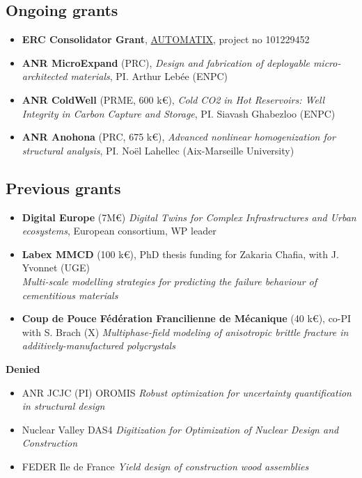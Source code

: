 \subsection*{\textcolor{navier_blue}{Ongoing grants}}
\begin{itemize}[noitemsep]
\item[2026] \textbf{ERC Consolidator Grant}, \href{https://erc-automatix.github.io/}{AUTOMATIX}, project no 101229452
\item[2025] \textbf{ANR MicroExpand} (PRC), \textit{Design and fabrication of deployable micro-architected materials}, PI. Arthur Lebée (ENPC)
\item[2025] \textbf{ANR ColdWell} (PRME, 600 k€), \textit{Cold CO2 in Hot Reservoirs: Well Integrity in Carbon Capture and Storage}, PI. Siavash Ghabezloo (ENPC)
\item[2024] \textbf{ANR Anohona} (PRC, 675 k€), \textit{Advanced nonlinear homogenization for structural analysis}, PI. Noël Lahellec (Aix-Marseille University)  
\end{itemize}

\subsection*{\textcolor{navier_blue}{Previous grants}}
\begin{itemize}[noitemsep] 
\item[2022] \textbf{Digital Europe} (7M€) \textit{Digital Twins for Complex Infrastructures and Urban ecosystems}, European consortium, WP leader
\item[2021] \textbf{Labex MMCD} (100 k€), PhD thesis funding for Zakaria Chafia, with J. Yvonnet (UGE)\\
\textit{Multi-scale modelling strategies for predicting the failure behaviour of cementitious materials}
\item[2021] \textbf{Coup de Pouce Fédération Francilienne de Mécanique} (40 k€), co-PI with S. Brach (X)
\textit{Multiphase-field modeling of anisotropic brittle fracture in additively-manufactured polycrystals}
\end{itemize}
\textbf{Denied}
\begin{itemize}[noitemsep]
\item[2022] ANR JCJC (PI) OROMIS \textit{Robust optimization for uncertainty quantification in structural design}
\item[2020] Nuclear Valley DAS4 \textit{Digitization for Optimization of Nuclear Design and Construction}
\item[2017] FEDER Ile de France \textit{Yield design of construction wood assemblies}
\end{itemize}


